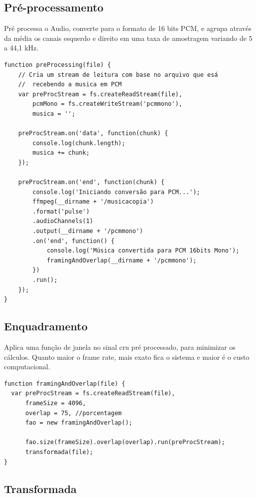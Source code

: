 \subsection{Pré-processamento}
\label{ss.preprocessamento}

Pré processa o Audio, converte para o formato de 16 bits PCM, e agrupa através da média os canais esquerdo e direito em uma taxa de amostragem variando de 5 a 44,1 kHz.
	
\begin{verbatim}
function preProcessing(file) {
    // Cria um stream de leitura com base no arquivo que esá
    //  recebendo a musica em PCM
    var preProcStream = fs.createReadStream(file),
        pcmMono = fs.createWriteStream('pcmmono'),
        musica = '';

    preProcStream.on('data', function(chunk) {
        console.log(chunk.length);
        musica += chunk;
    });

    preProcStream.on('end', function(chunk) {
        console.log('Iniciando conversão para PCM...');
        ffmpeg(__dirname + '/musicacopia')
        .format('pulse')
        .audioChannels(1)
        .output(__dirname + '/pcmmono')
        .on('end', function() {
            console.log('Música convertida para PCM 16bits Mono');
            framingAndOverlap(__dirname + '/pcmmono');
        })
        .run();
    });
} 
\end{verbatim}	

\subsection{Enquadramento}
\label{ss.enquadramento}

Aplica uma função de janela no sinal cru pré processado, para minimizar os cálculos. Quanto maior o frame rate, mais exato fica o sistema e maior é o custo computacional.

\begin{verbatim}
function framingAndOverlap(file) {
  var preProcStream = fs.createReadStream(file),
      frameSize = 4096, 
      overlap = 75, //porcentagem
      fao = new framingAndOverlap();
      
      fao.size(frameSize).overlap(overlap).run(preProcStream);
      transformada(file);
}
\end{verbatim}


\subsection{Transformada}
\label{ss.transformada}

